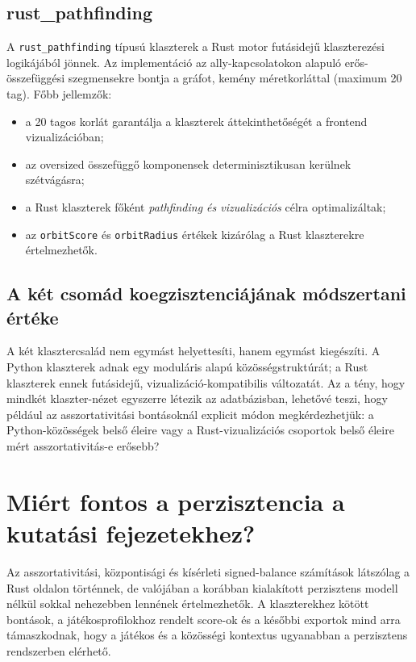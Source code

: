 ﻿\documentclass[a4paper,12pt]{report}
\begin{document}
\subsection{rust\_pathfinding}

A \texttt{rust\_pathfinding} típusú klaszterek a Rust motor futásidejű klaszterezési logikájából jönnek. Az implementáció az ally-kapcsolatokon alapuló erős-összefüggési szegmensekre bontja a gráfot, kemény méretkorláttal (maximum 20 tag). Főbb jellemzők:

\begin{itemize}
    \item a 20 tagos korlát garantálja a klaszterek áttekinthetőségét a frontend vizualizációban;
    \item az oversized összefüggő komponensek determinisztikusan kerülnek szétvágásra;
    \item a Rust klaszterek főként \emph{pathfinding és vizualizációs} célra optimalizáltak;
    \item az \texttt{orbitScore} és \texttt{orbitRadius} értékek kizárólag a Rust klaszterekre értelmezhetők.
\end{itemize}

\subsection{A két csomád koegzisztenciájának módszertani értéke}

A két klasztercsalád nem egymást helyettesíti, hanem egymást kiegészíti. A Python klaszterek adnak egy moduláris alapú közösségstruktúrát; a Rust klaszterek ennek futásidejű, vizualizáció-kompatibilis változatát. Az a tény, hogy mindkét klaszter-nézet egyszerre létezik az adatbázisban, lehetővé teszi, hogy például az asszortativitási bontásoknál explicit módon megkérdezhetjük: a Python-közösségek belső éleire vagy a Rust-vizualizációs csoportok belső éleire mért asszortativitás-e erősebb?

\section{Miért fontos a perzisztencia a kutatási fejezetekhez?}

Az asszortativitási, központisági és kísérleti signed-balance számítások látszólag a Rust oldalon történnek, de valójában a korábban kialakított perzisztens modell nélkül sokkal nehezebben lennének értelmezhetők. A klaszterekhez kötött bontások, a játékosprofilokhoz rendelt score-ok és a későbbi exportok mind arra támaszkodnak, hogy a játékos és a közösségi kontextus ugyanabban a perzisztens rendszerben elérhető.
\end{document}
